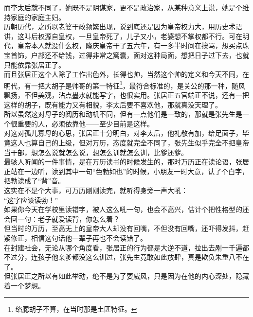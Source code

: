 \begin{multicols}{\theparacolNo}
而李太后就不同了，她既不是阴谋家，更不是政治家，从某种意义上说，她是个维持家庭的家庭主妇。\\

历朝历代，之所以老婆干政频繁出现，说到底还是因为皇帝权力大，用历史术语讲，这叫后权源自皇权，一旦皇帝死了，儿子又小，老婆想不掌权都不行。可在明代，皇帝本人就没什么权，隆庆皇帝干了五六年，有一多半时间在挨骂，想买点珠宝首饰，户部还不给钱，过得非常之窝囊，面对这种局面，想把日子过下去，也就只能依靠张居正了。\\

而且张居正这个人除了工作出色外，长得也帅，当然这个帅的定义和今天不同，在明代，有一把大胡子是帅哥的第一特征\footnote{络腮胡子不算，在当时那是土匪特征。}，最符合标准的，是关公的那一种，随风飘扬，不但美观，沾点墨水就能写字，也很实用。张居正五官端正不说，还有一把这样的胡子，既有能力又有相貌，李太后要不喜欢他，那就真没天理了。\\

所以虽然这对母子的阅历和动机不同，但有一点他们是一致的，那就是张先生是一个很重要的人，必须依靠他——至少目前是这样。\\

对这对孤儿寡母的心思，张居正十分明白，对李太后，他礼敬有加，给足面子，毕竟这人也算自己的上级，但对万历，态度就完全不同了，张先生似乎完全不把皇帝当干部，想怎么说就怎么说，想怎么训就怎么训，比爹还爹。\\

最骇人听闻的一件事情，是在万历读书的时候发生的，那时万历正在读论语，张居正站在一边听，读到其中一句“色勃如也”的时候，小朋友一时大意，认了个白字，把勃读成了“背”音。\\

这实在不是个大事，可万历刚刚读完，就听得身旁一声大吼：\\

“这字应该读勃！”\\

如果你今天在学校里读错字，被人这么吼一句，也会不高兴，估计个把性格型的还会回一句：老子就爱读背，你怎么着？\\

但当时的万历，至高无上的皇帝大人却没有回嘴，不但没有回嘴，还吓得发抖，赶紧修正，相信这句话他一辈子再也不会读错了。\\

在封建社会，无论从哪个角度看，张居正的行为都是大逆不道，拉出去剐一千遍都不过分，连孩子他亲爹都没这么训过，张先生竟敢如此放肆，真是欺负朱重八不在了。\\

但张居正之所以有如此举动，绝不是为了耍威风，只是因为在他的内心深处，隐藏着一个梦想。\\


\end{multicols}
